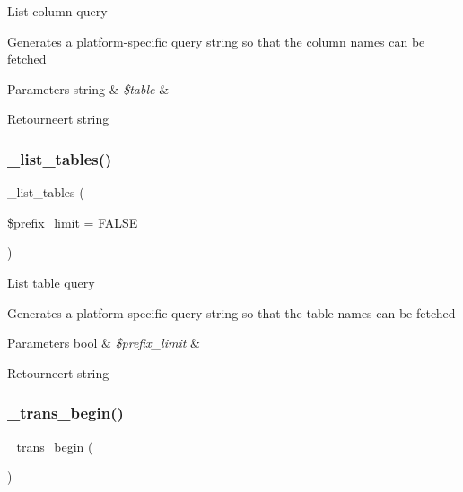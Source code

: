 List column query

Generates a platform-\/specific query string so that the column names can be fetched


\begin{DoxyParams}[1]{Parameters}
string & {\em \$table} & \\
\hline
\end{DoxyParams}
\begin{DoxyReturn}{Retourneert}
string 
\end{DoxyReturn}
\mbox{\label{class_c_i___d_b__mssql__driver_a435c0f3ce54fe7daa178baa8532ebd54}} 
\subsubsection{\texorpdfstring{\_list\_tables()}{\_list\_tables()}}
{\footnotesize\ttfamily \+\_\+list\+\_\+tables (\begin{DoxyParamCaption}\item[{}]{\$prefix\+\_\+limit = {\ttfamily FALSE} }\end{DoxyParamCaption})\hspace{0.3cm}{\ttfamily [protected]}}

List table query

Generates a platform-\/specific query string so that the table names can be fetched


\begin{DoxyParams}[1]{Parameters}
bool & {\em \$prefix\+\_\+limit} & \\
\hline
\end{DoxyParams}
\begin{DoxyReturn}{Retourneert}
string 
\end{DoxyReturn}
\mbox{\label{class_c_i___d_b__mssql__driver_ac81ac882c1d54347d810199a15856aac}} 
\subsubsection{\texorpdfstring{\_trans\_begin()}{\_trans\_begin()}}
{\footnotesize\ttfamily \+\_\+trans\+\_\+begin (\begin{DoxyParamCaption}{ }\end{DoxyParamCaption})\hspace{0.3cm}{\ttfamily [protected]}}

